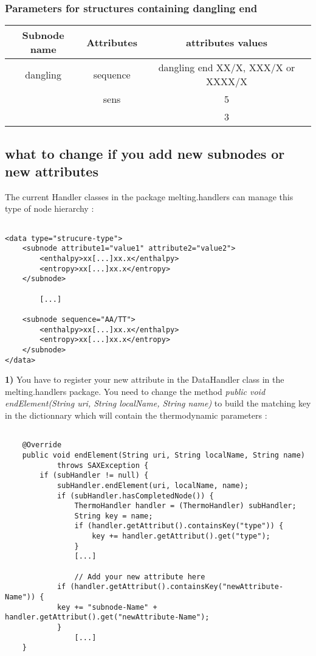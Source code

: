 \documentclass{article}
\begin{document}
\pagebreak
\subsubsection{Parameters for structures containing dangling end}

\begin{table}[hc]
\begin{tabular}[h]{| c | c | c |}
\textbf{Subnode name} & \textbf{Attributes} & \textbf{attributes values} \\
 \hline
dangling & sequence & dangling end XX/X, XXX/X or XXXX/X \\
 & sens & 5 \\
 & & 3 \\
  \hline
\end{tabular}
\end{table}

\subsection{what to change if you add new subnodes or new attributes}

The current Handler classes in the package melting.handlers can manage
this type of node hierarchy :

\begin{verbatim}

<data type="strucure-type">
	<subnode attribute1="value1" attribute2="value2">
		<enthalpy>xx[...]xx.x</enthalpy>
		<entropy>xx[...]xx.x</entropy>
	</subnode> 
	   	
	   	[...]
	
	<subnode sequence="AA/TT">
		<enthalpy>xx[...]xx.x</enthalpy>
		<entropy>xx[...]xx.x</entropy>
	</subnode> 	   	
</data>

\end{verbatim}

\textbf{1)} You have to register your new attribute in the DataHandler class in the melting.handlers
package. You need to change the method \textit{public void endElement(String uri, String localName, String name)} 
to build the matching key in the dictionnary which will contain the thermodynamic parameters :

\begin{verbatim}

	@Override
	public void endElement(String uri, String localName, String name)
			throws SAXException {
		if (subHandler != null) {
			subHandler.endElement(uri, localName, name);
			if (subHandler.hasCompletedNode()) {
				ThermoHandler handler = (ThermoHandler) subHandler;
				String key = name;
				if (handler.getAttribut().containsKey("type")) {
					key += handler.getAttribut().get("type");
				}
				[...]
				
				// Add your new attribute here
			if (handler.getAttribut().containsKey("newAttribute-Name")) {
			key += "subnode-Name" + handler.getAttribut().get("newAttribute-Name");
			}
				[...]
	}

\end{verbatim}
\end{document}
